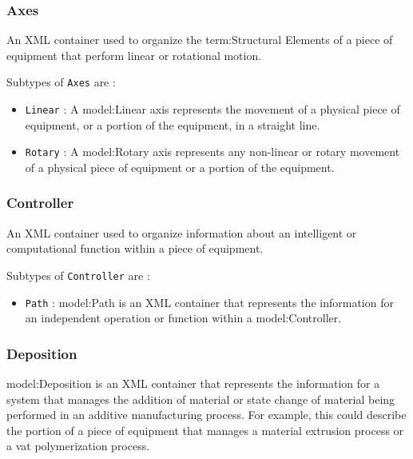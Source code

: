 \FloatBarrier

\subsubsection{Axes}
  \label{sec:Axes}


An XML container used to organize the {term:Structural Elements} of a piece of equipment that perform linear or rotational motion.

Subtypes of \texttt{Axes} are :

\begin{itemize}
\item \texttt{Linear} : A {model:Linear} axis represents the movement of a physical piece of equipment, or a portion of the equipment, in a straight line. 

\item \texttt{Rotary} : A {model:Rotary} axis represents any non-linear or rotary movement of a physical piece of equipment or a portion of the equipment.

\end{itemize}

\FloatBarrier

\subsubsection{Controller}
  \label{sec:Controller}


An XML container used to organize information about an intelligent or computational function within a piece of equipment.

Subtypes of \texttt{Controller} are :

\begin{itemize}
\item \texttt{Path} : {model:Path} is an XML container that represents the information for an independent operation or function within a {model:Controller}.

\end{itemize}

\FloatBarrier

\subsubsection{Deposition}
  \label{sec:Deposition}


{model:Deposition} is an XML container that represents the information for a system that manages the addition of material or state change of material being performed in an additive manufacturing process.  For example, this could describe the portion of a piece of equipment that manages a material extrusion process or a vat polymerization process.

